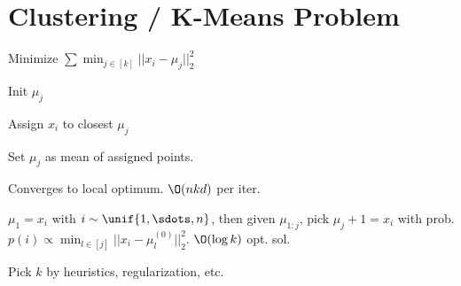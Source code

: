 \section{Clustering / K-Means Problem}
\begin{definition}[Problem.]
  Minimize \(\sum \min_{j \in [k]} ||x_i - \mu_j||_2^2\)
\end{definition}

\begin{definition}
  \begin{enumerate*}
    \item Init \(\mu_j\)
    \item Assign \(x_i\) to closest \(\mu_j\)
    \item Set \(\mu_j\) as mean of assigned points.
  \end{enumerate*}
\end{definition}

Converges to local optimum. \(\O(nkd)\) per iter.

\begin{definition}[K-Means++]
  \(\mu_1 = x_i\) with \(i \sim \unif\{1, \sdots, n\}\), then given \(\mu_{1:j}\), pick \(\mu_j+1 = x_i\) with prob. \(p(i) \propto \min_{l \in [j]} ||x_i - \mu_l^{(0)}||_2^2\).
  \(\O(\log k)\) opt. sol.
\end{definition}

Pick \(k\) by heuristics, regularization, etc.
